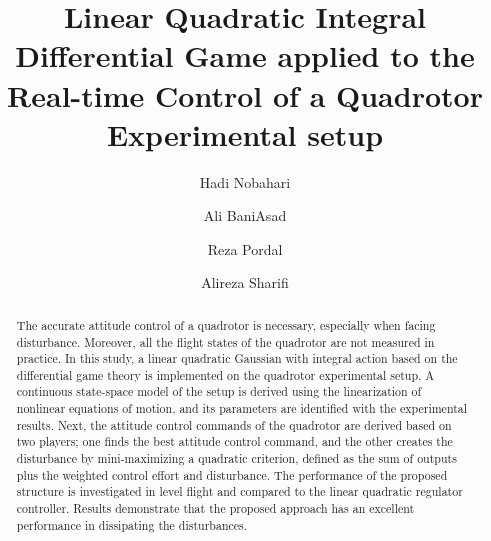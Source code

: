 \documentclass[3p,times]{elsarticle}
\begin{document}
\begin{frontmatter}



\dochead{}

\title{Linear Quadratic Integral Differential Game applied to the Real-time Control of a Quadrotor Experimental setup}


\author{Hadi Nobahari}
\author{Ali BaniAsad}
\author{Reza Pordal}
\author{Alireza Sharifi}

\address{}

\begin{abstract}
    The accurate attitude control of a quadrotor is necessary, especially when facing disturbance. Moreover, all the flight states of the quadrotor are not measured in practice. In this study, a linear quadratic Gaussian with integral action based on the differential game theory is implemented on the quadrotor experimental setup. A continuous state-space model of the setup is derived using the linearization of nonlinear equations of motion, and its parameters are identified with the experimental results. Next, the attitude control commands of the quadrotor are derived based on two players; one finds the best attitude control command, and the other creates the disturbance by mini-maximizing a quadratic criterion, defined as the sum of outputs plus the weighted control effort and disturbance. The performance of the proposed structure is investigated in level flight and compared to the linear quadratic regulator controller. Results demonstrate that the proposed approach has an excellent performance in dissipating the disturbances.
\end{abstract}


\end{frontmatter}
\end{document}
